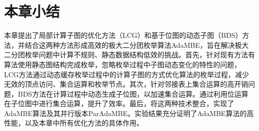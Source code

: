 


\section{本章小结}

本章提出了局部计算子图的优化方法（LCG）和基于位图的动态子图（BDS）方法，并结合这两种方法形成高效的极大二分团枚举算法AdaMBE，旨在解决极大二分团枚举问题中计算不规则、静态数据结构低效的挑战。首先，针对现有方法有算法使用静态图结构完成枚举，忽略枚举过程中子图动态变化的特性的问题，LCG方法通过动态缓存枚举过程中的计算子图的方式优化算法的枚举过程，减少无效的顶点访问、集合运算和枚举节点。其次，针对邻接表上集合运算的高开销问题，BDS方法在计算过程中动态生成子位图，以加速集合运算。通过利用位运算在子位图中进行集合运算，提升了效率。最后，将这两种技术整合，实现了AdaMBE算法及其并行版本ParAdaMBE。实验结果充分证明了AdaMBE算法的高性能，以及本章中所有优化方法的具体作用。